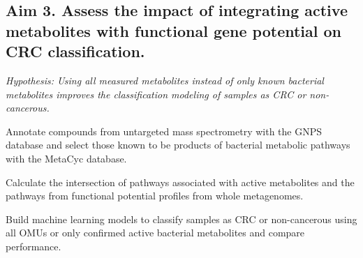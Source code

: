 \documentclass[11pt]{article}
\begin{document}
\subsection*{Aim 3. Assess the impact of integrating active metabolites with functional gene potential on CRC classification.}
\textit{Hypothesis: Using all measured metabolites instead of only known bacterial metabolites improves the classification modeling of samples as CRC or non-cancerous.}

\begin{compactenum}[A.]
    \item Annotate compounds from untargeted mass spectrometry with the GNPS database and select those known to be products of bacterial metabolic pathways with the MetaCyc database.
    \item Calculate the intersection of pathways associated with active metabolites and the pathways from functional potential profiles from whole metagenomes.
    \item Build machine learning models to classify samples as CRC or non-cancerous using all OMUs or only confirmed active bacterial metabolites and compare performance.
\end{compactenum}
\end{document}
